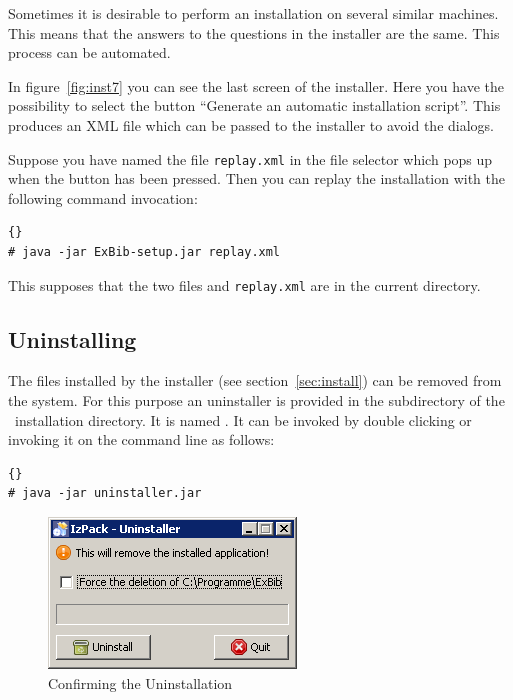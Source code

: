 Sometimes it is desirable to perform an installation on several
similar machines. This means that the answers to the questions in the
installer are the same. This process can be automated.

In figure~\ref{fig:inst7} you can see the last screen of the
installer. Here you have the possibility to select the button
``Generate an automatic installation script''. This produces an XML
file which can be passed to the installer to avoid the
dialogs.

Suppose you have named the file \texttt{replay.xml} in the file
selector which pops up when the button has been pressed. Then you can
replay the installation with the following command invocation:

\begin{lstlisting}{}
# java -jar ExBib-setup.jar replay.xml
\end{lstlisting}

This supposes that the two files  and
\texttt{replay.xml} are in the current directory.

\subsection{Uninstalling \ExBib}\label{sec:uninst}

The files installed by the installer (see section~\ref{sec:install})
can be removed from the system. For this purpose an uninstaller is
provided in the subdirectory  of the \ExBib\
installation directory. It is named . It can be
invoked by double clicking or invoking it on the command line as follows:

\begin{lstlisting}{}
# java -jar uninstaller.jar
\end{lstlisting}

\begin{figure}[!ht]
  \centering
  \includegraphics[width=.45\textwidth]{img/uninst1}
  \caption{Confirming the Uninstallation}
  \label{fig:uninst1}
\end{figure}

